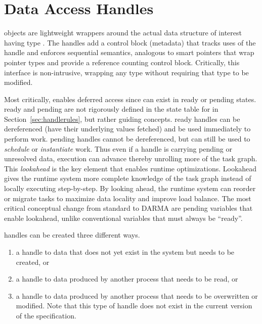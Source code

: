 

\section{Data Access Handles}
\label{sec:handles}
 objects are lightweight wrappers around the actual
data structure of interest having type . 
The \glspl{handle} add a control block (metadata) that tracks uses of the \gls{handle} and enforces
\gls{sequential semantics}, analogous to smart pointers that wrap pointer types and provide a reference counting control block.
Critically, this interface is non-intrusive, wrapping any type  without requiring that type to be modified.

Most critically, \ahandle enables deferred access since \ahandle can exist in
\gls{ready} or \gls{pending} states. 
\Gls{ready} and \gls{pending} are not rigorously defined in the state table for \ahandle in
Section~\ref{sec:handlerules}, but rather guiding concepts.
\Gls{ready} \glspl{handle} can be dereferenced (have their underlying values
\gls{fetch}ed) and be used immediately to perform work.
\Gls{pending} \glspl{handle} cannot be dereferenced, but can still be used to \emph{schedule} or \emph{instantiate} work.
Thus even if a \gls{handle} is carrying \gls{pending} or unresolved data, execution can advance thereby unrolling more of the task graph.
This \emph{lookahead} is the key element that enables runtime optimizations.
Lookahead gives the \gls{runtime system} more complete knowledge of the task graph instead of locally executing step-by-step.
By looking ahead, the \gls{runtime system} can reorder or migrate \glspl{task} to maximize data locality and improve load balance.
The most critical conceptual change from standard \CC{} to \gls{DARMA} are
\gls{pending} variables that enable lookahead, unlike conventional \CC{}
variables that must always be ``\gls{ready}''.

\Glspl{handle} can be created three different ways.
\begin{enumerate}
  \item a \gls{handle} to data that does not yet exist in the system
but needs to be created, or
\item a \gls{handle} to data produced by another process that needs to
be read, or 
\item a \gls{handle} to data produced by another process that needs to be overwritten or modified. 
  Note that this type of \gls{handle} does not exist in the current version of
  the specification.
\end{enumerate}

